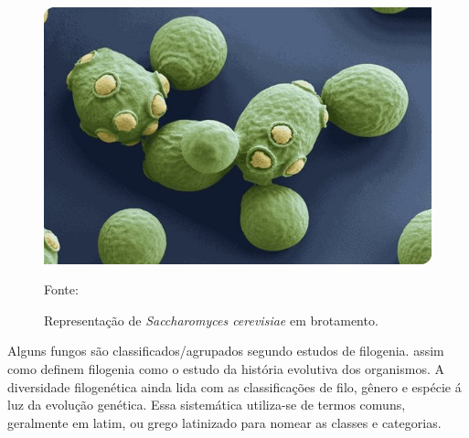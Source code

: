 \documentclass[tcc2]{classe_uftex/uftex}
\begin{document}
    \begin{figure}[ht]
    \centering
      \includegraphics[scale=0.4]{TCC_Johnny/img/lev_brotamento.jpg}
      \caption{Representação de \emph{Saccharomyces cerevisiae} em brotamento.}
       \raggedright \scriptsize \centering Fonte: 
      \label{fig:fig007}
    \end{figure} %

Alguns fungos são classificados/agrupados segundo estudos de filogenia.  assim como  definem filogenia como o estudo da história evolutiva dos organismos. A diversidade filogenética ainda lida com as classificações de filo, gênero e espécie á luz da evolução genética. Essa sistemática utiliza-se de termos comuns, geralmente em latim, ou grego latinizado para nomear as classes e categorias.%
\end{document}
